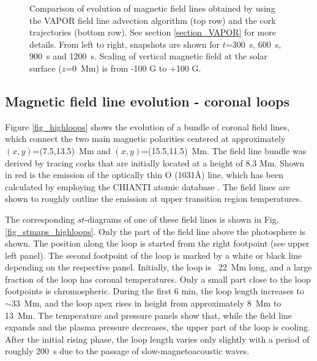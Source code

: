\documentclass{aa}
\begin{document}
{\begin{figure}[!h]
\begin{center}
\end{center}
\caption{Comparison of evolution of magnetic field lines obtained by using the VAPOR field line advection algorithm (top row) and the cork trajectories (bottom row). See section \ref{section_VAPOR} for more details. From left to right, snapshots are shown for $t$=300~s, 600~s, 900~s and 1200~s. Scaling of vertical magnetic field at the solar surface ($z$=0~Mm) is from -100 G to +100 G. \label{VAPOR_vs_corks}}
\end{figure}



\subsection{Magnetic field line evolution - coronal loops}\label{section_coronal_loops}

Figure \ref{fig_highloops} shows the evolution of a bundle of coronal field lines, which connect the two main magnetic polarities centered at approximately $(x,y)$=(7.5,13.5)~Mm and $(x,y)$=(15.5,11.5)~Mm. The field line bundle was derived by tracing corks that are initially located at a height of 8.3 Mm. %
Shown in red is the emission of the optically thin O{} (1031\AA) line, which has been calculated by employing the CHIANTI atomic database \citep{dere+al:1997, landi+al:2013}. The field lines are shown to roughly outline the emission at upper transition region temperatures.%

The corresponding $st$-diagrams of one of these field lines is shown in Fig. \ref{fig_stmaps_highloops}. Only the part of the field line above the photosphere is shown. The position along the loop is started from the right footpoint (see upper left panel). The second footpoint of the loop is marked by a white or black line depending on the respective panel. Initially, the loop is ~22~Mm long, and a large fraction of the loop has coronal temperatures. Only a small part close to the loop footpoints is chromospheric. During the first 6 min, the loop length increases to $\sim$33~Mm, and the loop apex rises in height from approximately 8~Mm to 13~Mm. The temperature and pressure panels show that, while the field line expands and the plasma pressure decreases, the upper part of the loop is cooling. After the initial rising phase, the loop length varies only slightly with a period of roughly 200~s due to the passage of slow-magnetoacoustic waves.   

}
\end{document}
